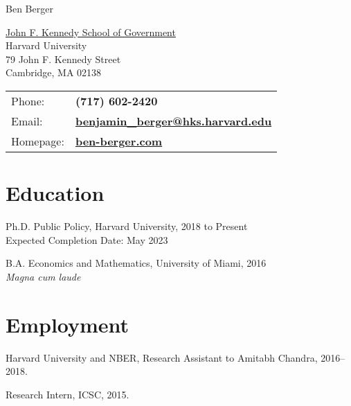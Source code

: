 \documentclass[letterpaper]{article}
\def\name{Ben Berger}
\renewenvironment{itemize}{
  \begin{list}{}{
    \setlength{\leftmargin}{1.5em}
  }
}{
  \end{list}
}
\begin{document}
{\huge \name}


\vspace{0.25in}

\begin{minipage}{0.45\linewidth}
  \href{http://www.hks.harvard.edu/}{John F. Kennedy School of Government} \\
  Harvard University \\
  79 John F. Kennedy Street \\
  Cambridge, MA 02138
\end{minipage}
\begin{minipage}{0.45\linewidth}
  \begin{tabular}{ll}
    Phone: & \bf (717) 602-2420 \\
    Email: & \href{mailto:benjamin\_berger@hks.harvard.edu}{\bf benjamin\_berger@hks.harvard.edu} \\
    Homepage: & \href{http://ben-berger.com/}{\bf ben-berger.com} \\
  \end{tabular}
\end{minipage}



\section*{Education}

\begin{itemize}
  \item Ph.D. Public Policy, Harvard University, 2018 to Present \\
  Expected Completion Date: May 2023

  \item B.A. Economics and Mathematics, University of Miami, 2016 \\
  \textit{Magna cum laude}
\end{itemize}


\section*{Employment}

\begin{itemize}
\item Harvard University and NBER, Research Assistant to Amitabh Chandra, 2016--2018.
\item Research Intern, ICSC, 2015.
\end{itemize}
\end{document}
